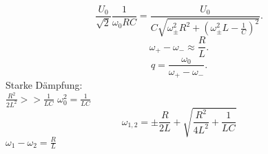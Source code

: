 \begin{equation*}
    \frac{U_0}{\sqrt{2}} \frac{1}{ω_0RC} = \frac{U_0}{C\sqrt{ω_{\pm}^2R^2 + \left(ω_{\pm}^2L - \frac{1}{C}\right)^2}}.
\end{equation*}
\begin{equation*}
    ω_+ - ω_- \approx \frac{R}{L}.
\end{equation*}
\begin{equation*}
    q = \frac{ω_0}{ω_+ - ω_-}.
\end{equation*}
Starke Dämpfung:\\ $\frac{R^2}{2L^2} >> \frac{1}{LC}$
$ω_0^2 = \frac{1}{LC}$
\begin{equation*}
    ω_{1,2} = \pm \frac{R}{2L} + \sqrt{\frac{R^2}{4L^2} + \frac{1}{LC}}
\end{equation*}
$ω_1 - ω_2 = \frac{R}{L}$
